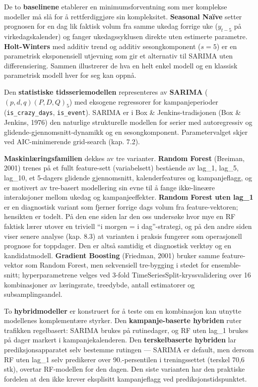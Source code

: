 \documentclass[
  norsk,
  11pt,
  a4paper,
]{article}
\begin{document}
De to \textbf{baselinene} etablerer en minimumsforventning som mer
komplekse modeller må slå for å rettferdiggjøre sin kompleksitet.
\textbf{Seasonal Naïve} setter prognosen for en dag lik faktisk volum
fra samme ukedag forrige uke (\(y_{t-5}\) på virkedagskalender) og
fanger ukedagssyklusen direkte uten estimerte parametre.
\textbf{Holt-Winters} med additiv trend og additiv sesongkomponent
(\(s=5\)) er en parametrisk eksponensiell utjevning som gir et
alternativ til SARIMA uten differensiering. Sammen illustrerer de hva en
helt enkel modell og en klassisk parametrisk modell hver for seg kan
oppnå.

Den \textbf{statistiske tidsseriemodellen} representeres av
\textbf{SARIMA} (\((p,d,q)(P,D,Q)_5\)) med eksogene regressorer for
kampanjeperioder (\texttt{is\_crazy\_days}, \texttt{is\_event}). SARIMA
er i Box \& Jenkins-tradisjonen (Box \& Jenkins, 1976) den naturlige
strukturelle modellen for serier med autoregressiv og
glidende-gjennomsnitt-dynamikk og en sesongkomponent. Parametervalget
skjer ved AIC-minimerende grid-search (kap. 7.2).

\textbf{Maskinlæringsfamilien} dekkes av tre varianter. \textbf{Random
Forest} (Breiman, 2001) trenes på et fullt feature-sett (variabelsett)
bestående av lag\_1, lag\_5, lag\_10, et 5-dagers glidende gjennomsnitt,
kalenderfeatures og kampanjeflagg, og er motivert av tre-basert
modellering sin evne til å fange ikke-lineære interaksjoner mellom
ukedag og kampanjeeffekter. \textbf{Random Forest uten lag\_1} er en
diagnostisk variant som fjerner forrige dags volum fra feature-vektoren;
hensikten er todelt. På den ene siden lar den oss undersøke hvor mye en
RF faktisk lærer utover en triviell ``i morgen = i dag''-strategi, og på
den andre siden viser senere analyse (kap. 8.3) at varianten i praksis
fungerer som operasjonell prognose for toppdager. Den er altså samtidig
et diagnostisk verktøy og en kandidatmodell. \textbf{Gradient Boosting}
(Friedman, 2001) bruker samme feature-vektor som Random Forest, men
sekvensiell tre-bygging i stedet for ensemble-snitt; hyperparametrene
velges ved 3-fold TimeSeriesSplit-kryssvalidering over 16 kombinasjoner
av læringsrate, treedybde, antall estimatorer og subsamplingsandel.

To \textbf{hybridmodeller} er konstruert for å teste om en kombinasjon
kan utnytte modellenes komplementære styrker. Den
\textbf{kampanje-baserte hybriden} ruter trafikken regelbasert: SARIMA
brukes på rutinedager, og RF uten lag\_1 brukes på dager markert i
kampanjekalenderen. Den \textbf{terskelbaserte hybriden} lar
prediksjonsapparatet selv bestemme rutingen --- SARIMA er default, men
dersom RF uten lag\_1 selv predikerer over 90.-persentilen i
treningssettet (terskel 70,6 stk), overtar RF-modellen for den dagen.
Den siste varianten har den praktiske fordelen at den ikke krever
eksplisitt kampanjeflagg ved prediksjonstidspunktet.
\end{document}

